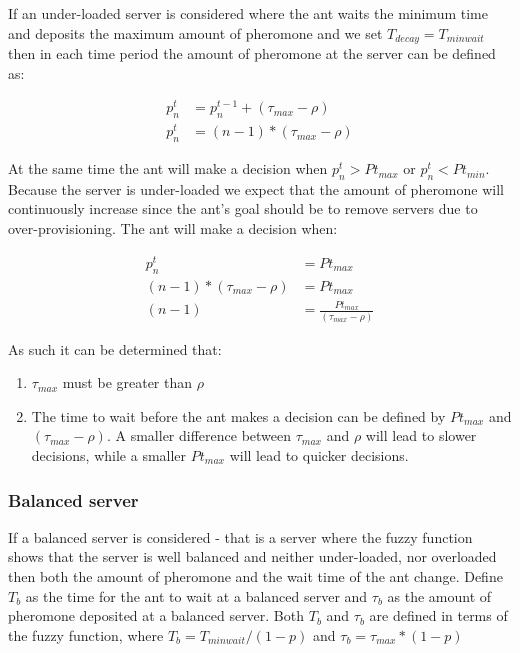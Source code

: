 If an under-loaded server is considered where the ant waits the minimum time and deposits the maximum amount of pheromone and we set $T_{decay} = T_{minwait}$ then in each time period the amount of pheromone at the server can be defined as:

\begin{equation}
\begin{aligned}
p^{t}_{n} &= p^{t-1}_{n} + (\tau_{max} - \rho) \\
p^{t}_{n} &= (n - 1) * (\tau_{max} - \rho)
\end{aligned}
\end{equation}

At the same time the ant will make a decision when $p^{t}_{n} > Pt_{max}$ or $p^{t}_{n} < Pt_{min}$. Because the server is under-loaded we expect that the amount of pheromone will continuously increase since the ant's goal should be to remove servers due to over-provisioning. The ant will make a decision when:

\begin{equation}
\begin{aligned}
p^{t}_{n} &= Pt_{max} \\
(n - 1) * (\tau_{max} - \rho) &= Pt_{max} \\
(n - 1) &= \frac{Pt_{max}}{(\tau_{max} - \rho)} 
\end{aligned}
\end{equation}

As such it can be determined that:

\begin{enumerate}
	\item $\tau_{max}$ must be greater than $\rho$
	\item The time to wait before the ant makes a decision can be defined by $Pt_{max}$ and $(\tau_{max} - \rho)$. A smaller difference between $\tau_{max}$ and $\rho$ will lead to slower decisions, while a smaller $Pt_{max}$ will lead to quicker decisions.
\end{enumerate}

\subsubsection{Balanced server}

If a balanced server is considered - that is a server where the fuzzy function shows that the server is well balanced and neither under-loaded, nor overloaded then both the amount of pheromone and the wait time of the ant change. Define $T_{b}$ as the time for the ant to wait at a balanced server and $\tau_{b}$ as the amount of pheromone deposited at a balanced server. Both $T_{b}$ and $\tau_{b}$ are defined in terms of the fuzzy function, where $T_{b} = T_{minwait} / (1 - p)$ and $\tau_{b} = \tau_{max} * (1 - p)$

